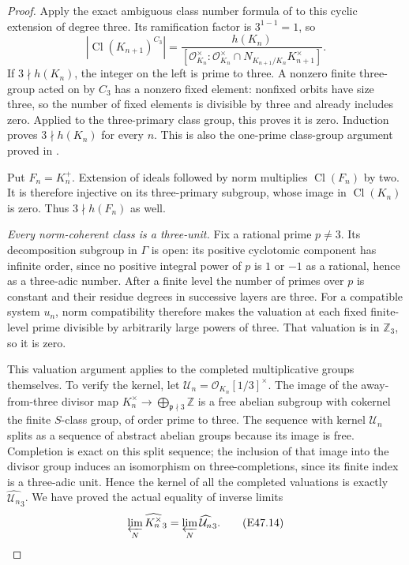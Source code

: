 \begin{proof}
Apply the exact ambiguous class number formula
of \cite[Theorem 1, p.~1 of the opened preprint]{E_LemmermeyerAmbiguous}
to this cyclic extension of degree three. Its
ramification factor is $3^{1-1}=1$, so
\[
 |\operatorname{Cl}(K_{n+1})^{C_3}|
   =\frac{h(K_n)}
    {[\mathcal O_{K_n}^{\times}:
       \mathcal O_{K_n}^{\times}\cap
                 N_{K_{n+1}/K_n}K_{n+1}^{\times}]}.
 \tag{E47.13}
\]
If $3\nmid h(K_n)$, the integer on the left
is prime to three. A nonzero finite three-group
acted on by $C_3$ has a nonzero fixed element:
nonfixed orbits have size three, so the number
of fixed elements is divisible by three and
already includes zero. Applied to the three-primary class
group, this proves it is zero. Induction proves
$3\nmid h(K_n)$ for every $n$.
This is also the one-prime class-group argument
proved in \cite[Lemma 1.3.13]{E_SharifiIwasawa}.

Put $F_n=K_n^+$. Extension of ideals followed
by norm multiplies $\operatorname{Cl}(F_n)$
by two. It is therefore injective on its
three-primary subgroup, whose image in
$\operatorname{Cl}(K_n)$ is zero. Thus
$3\nmid h(F_n)$ as well.

\emph{Every norm-coherent class is a three-unit.}
Fix a rational prime $p\ne3$. Its decomposition
subgroup in $\Gamma$ is open: its positive
cyclotomic component has infinite order, since
no positive integral power of $p$ is $1$ or
$-1$ as a rational, hence as a three-adic number.
After a finite level the number of primes over
$p$ is constant and their residue degrees in
successive layers are three. For a compatible
system $u_n$, norm compatibility therefore
makes the valuation at each fixed finite-level
prime divisible by arbitrarily large powers
of three. That valuation is in $\mathbb Z_3$,
so it is zero.

This valuation argument applies to the completed
multiplicative groups themselves. To verify the
kernel, let $\mathcal U_n=\mathcal O_{K_n}[1/3]^\times$.
The image of the away-from-three divisor map
$K_n^\times\to\bigoplus_{\mathfrak p\nmid3}\mathbb Z$
is a free abelian subgroup with cokernel the
finite $S$-class group, of order prime to three.
The sequence with kernel $\mathcal U_n$ splits
as a sequence of abstract abelian groups because
its image is free. Completion is exact on this
split sequence; the inclusion of that image into
the divisor group induces an isomorphism on
three-completions, since its finite index is a
three-adic unit. Hence the kernel of all the
completed valuations is exactly
$\widehat{\mathcal U_n}_3$. We have proved the
actual equality of inverse limits
\[
 \varprojlim_N\widehat{K_n^\times}_3
       =\varprojlim_N\widehat{\mathcal U_n}_3.
 \tag{E47.14}
\]


\end{proof}
